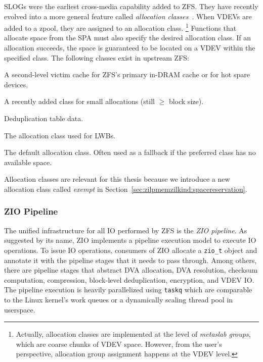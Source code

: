 \documentclass[12pt,a4paper,twoside]{book}
\begin{document}
{SLOGs were the earliest cross-media capability added to ZFS.
They have recently evolved into a more general feature called \textit{allocation classes}~\cite{openzfsAllocationClasses}.
When VDEVs are added to a zpool, they are assigned to an allocation class.%
\footnote{
 Actually, allocation classes are implemented at the level of \textit{metaslab groups}, which are coarse chunks of VDEV space.
 However, from the user's perspective, allocation group assignment happens at the VDEV level.
}
Functions that allocate space from the SPA must also specify the desired allocation class.
If an allocation succeeds, the space is guaranteed to be located on a VDEV within the specified class.
The following classes exist in upstream ZFS:
\begin{description}[noitemsep,leftmargin=1.5cm,labelindent=1cm]
    \item[aux] A second-level victim cache for ZFS's primary in-DRAM cache or for hot spare devices.
    \item[special] A recently added class for small allocations (still $\ge$ block size).
    \item[dedup] Deduplication table data.
    \item[log] The allocation class used for LWBs.
    \item[normal] The default allocation class. Often used as a fallback if the preferred class has no available space.
\end{description}
Allocation classes are relevant for this thesis because we introduce a new allocation class called \textit{exempt} in Section~\ref{sec:zilpmemzilkind:spacereservation}.

\subsubsection{ZIO Pipeline}

The unified infrastructure for all IO performed by ZFS is the \textit{ZIO pipeline}.
As suggested by its name, ZIO implements a pipeline execution model to execute IO operations.
To issue IO operations, consumers of ZIO allocate a \lstinline{zio_t} object and annotate it with the pipeline stages that it needs to pass through.
Among others, there are pipeline stages that abstract DVA allocation, DVA resolution, checksum computation, compression, block-level deduplication, encryption, and VDEV IO.
The pipeline execution is heavily parallelized using \lstinline{taskq} which are comparable to the Linux kernel's work queues or a dynamically scaling thread pool in userspace.

}
\end{document}
